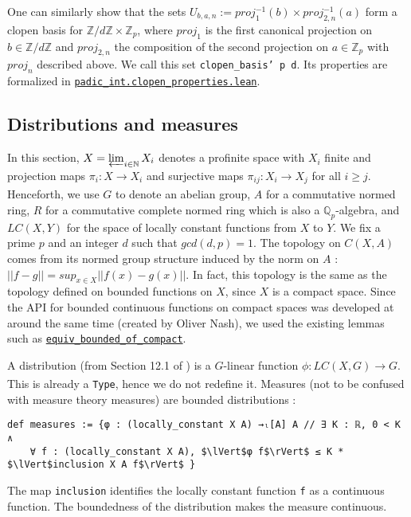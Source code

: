\documentclass[a4paper,UKenglish,cleveref, autoref, thm-restate]{lipics-v2021}
\newcommand{\lean}[1]{\texttt{#1}\xspace} %
\begin{document}
One can similarly show that the sets $U_{b, a, n} := proj_1^{-1} (b) \times proj_{2,n} ^{-1} (a)$ form a clopen basis for 
$\mathbb{Z} / d \mathbb{Z} \times \mathbb{Z}_p$, where $proj_1$ is the first canonical projection on $b \in \mathbb{Z} / d \mathbb{Z}$ 
and $proj_{2,n}$ the composition of the second projection on $a \in \mathbb{Z}_p$ with $proj_n$ described above. We call this set 
\lean{clopen\_basis' p d}. Its properties are formalized in \href{https://github.com/laughinggas/p-adic-L-functions/blob/main/src/padic_int/clopen_properties.lean}{\lean{padic\_int.clopen\_properties.lean}}.

\subsection{Distributions and measures}
In this section, $X = \varprojlim_{i \in \mathbb{N}} X_i$ denotes a profinite space with $X_i$ finite and
projection maps $\pi_i : X \xrightarrow[]{} X_i$ and surjective maps
$\pi_{ij} : X_i \xrightarrow[]{} X_j$ for all $i \ge j$. Henceforth, we use $G$ to denote an abelian group,
$A$ for a commutative normed ring, $R$ for a commutative complete normed ring which is also a $\mathbb{Q}_p$-algebra, 
and $LC(X,Y)$ for the space of locally constant functions from $X$ to $Y$. 
We fix a prime $p$ and an integer $d$ such that $gcd(d, p) =1$. \newline
The topology on $C(X, A)$ comes from its normed group structure induced by the norm on $A$ :
$|| f - g || = sup_{x \in X} || f(x) - g(x) ||$. In fact, this topology is the same as the 
topology defined on bounded functions on $X$, since $X$ is a compact space. Since the API for bounded 
continuous functions on compact spaces was developed at around the same time (created by Oliver Nash), 
we used the existing lemmas such as 
\href{https://github.com/leanprover-community/mathlib/blob/32253a1a1071173b33dc7d6a218cf722c6feb514/src/topology/continuous_function/compact.lean#L47}{\lean{equiv\_bounded\_of\_compact}}.

A distribution (from Section 12.1 of \cite{cyc}) is a $G$-linear function $\phi : LC(X, G) \xrightarrow[]{} G$. 
This is already a \lean{Type}, hence we do not redefine it. 
Measures (not to be confused with measure theory measures) are bounded distributions :
\begin{lstlisting}
def measures := {φ : (locally_constant X A) →ₗ[A] A // ∃ K : ℝ, 0 < K ∧ 
    ∀ f : (locally_constant X A), $\lVert$φ f$\rVert$ ≤ K * $\lVert$inclusion X A f$\rVert$ }
\end{lstlisting}
The map \lean{inclusion} identifies the locally constant function \lean{f} as a continuous function. 
The boundedness of the distribution makes the measure continuous.
\end{document}
